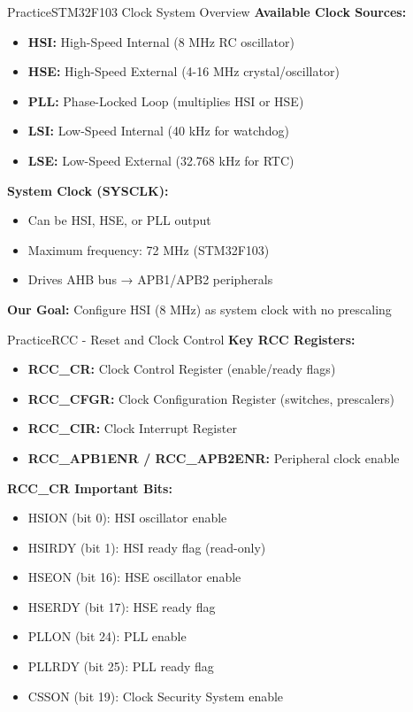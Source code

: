 \documentclass{beamer}
\begin{document}
\begin{frame}{Practice}{STM32F103 Clock System Overview}
	\textbf{Available Clock Sources:}
	\begin{itemize}
		\item \textbf{HSI:} High-Speed Internal (8 MHz RC oscillator)
		\item \textbf{HSE:} High-Speed External (4-16 MHz crystal/oscillator)
		\item \textbf{PLL:} Phase-Locked Loop (multiplies HSI or HSE)
		\item \textbf{LSI:} Low-Speed Internal (40 kHz for watchdog)
		\item \textbf{LSE:} Low-Speed External (32.768 kHz for RTC)
	\end{itemize}
	
	\medskip
	\textbf{System Clock (SYSCLK):}
	\begin{itemize}
		\item Can be HSI, HSE, or PLL output
		\item Maximum frequency: 72 MHz (STM32F103)
		\item Drives AHB bus → APB1/APB2 peripherals
	\end{itemize}
	
	\medskip
	\textbf{Our Goal:} Configure HSI (8 MHz) as system clock with no prescaling
\end{frame}

\begin{frame}{Practice}{RCC - Reset and Clock Control}
	\textbf{Key RCC Registers:}
	\begin{itemize}
		\item \textbf{RCC\_CR:} Clock Control Register (enable/ready flags)
		\item \textbf{RCC\_CFGR:} Clock Configuration Register (switches, prescalers)
		\item \textbf{RCC\_CIR:} Clock Interrupt Register
		\item \textbf{RCC\_APB1ENR / RCC\_APB2ENR:} Peripheral clock enable
	\end{itemize}
	
	\medskip
	\textbf{RCC\_CR Important Bits:}
	\begin{itemize}
		\item HSION (bit 0): HSI oscillator enable
		\item HSIRDY (bit 1): HSI ready flag (read-only)
		\item HSEON (bit 16): HSE oscillator enable
		\item HSERDY (bit 17): HSE ready flag
		\item PLLON (bit 24): PLL enable
		\item PLLRDY (bit 25): PLL ready flag
		\item CSSON (bit 19): Clock Security System enable
	\end{itemize}
\end{frame}
\end{document}
